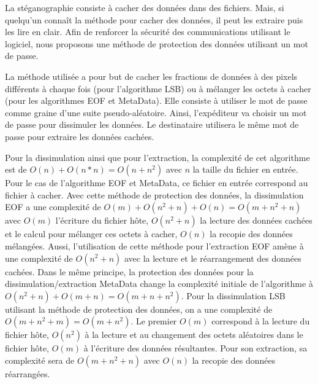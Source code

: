 \documentclass[11pt]{article}
\begin{document}
La stéganographie consiste à cacher des données dans des fichiers. Mais, 
si quelqu'un connaît la méthode pour cacher des données, il peut les extraire 
puis les lire en clair. 
Afin de renforcer la sécurité des communications utilisant le logiciel, 
nous proposons une méthode de protection des données utilisant un mot de passe. 

La méthode utilisée a pour but de cacher les fractions de données à des pixels 
différents à chaque fois (pour l'algorithme LSB) ou à mélanger les octets 
à cacher (pour les algorithmes EOF et MetaData). 
Elle consiste à utiliser le mot de passe comme graine d'une suite pseudo-aléatoire. 
Ainsi, l'expéditeur va choisir un mot de passe pour dissimuler les données. 
Le destinataire utilisera le même mot de passe pour extraire les données cachées.

\begin{minipage}{.6\textwidth}
Pour la dissimulation ainsi que pour l'extraction, la complexité de cet 
algorithme est de $O(n)+O(n*n)=O(n+n^2)$ avec $n$ la taille
du fichier en entrée. \newline 
Pour le cas de l'algorithme EOF et MetaData, ce fichier en entrée correspond 
au fichier à cacher. \newline
Avec cette méthode de protection des données, la dissimulation EOF a une 
complexité de $O(m)+O(n^2+n)+O(n)=O(m+n^2+n)$ avec $O(m)$ l'écriture du 
fichier hôte, $O(n^2+n)$ la lecture des données cachées et le calcul pour 
mélanger ces octets à cacher, $O(n)$ la recopie des données mélangées. 
\newline
Aussi, l'utilisation de cette méthode pour l'extraction EOF amène à une 
complexité de $O(n^2+n)$ avec la lecture et le réarrangement 
des données cachées. 
\newline \newline
Dans le même principe, la protection des données pour la dissimulation/extraction 
MetaData change la complexité initiale de l'algorithme à $O(n^2+n)+O(m+n)=O(m+n+n^2)$. 
\newline \newline
Pour la dissimulation LSB utilisant la méthode de protection 
des données, on a une complexité de $O(m+n^2+m)=O(m+n^2)$. Le premier $O(m)$ 
correspond à la lecture du fichier hôte, $O(n^2)$ à la lecture et au changement des
octets aléatoires dans le fichier hôte, $O(m)$ à l'écriture des données résultantes. 
Pour son extraction, sa complexité sera de $O(m+n^2+n)$ avec $O(n)$ la recopie des
données réarrangées. 
\end{minipage}
\end{document}
